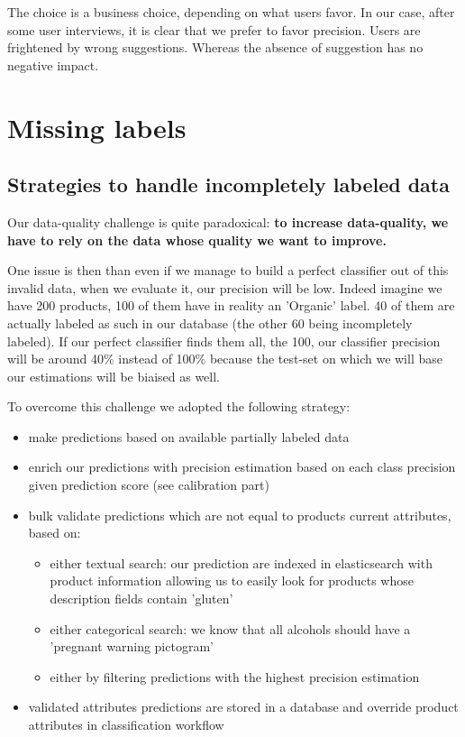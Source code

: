 The choice is a business choice, depending on what users favor. In our case, after some user interviews, it is clear that we prefer to favor precision. Users are frightened by wrong suggestions. Whereas the absence of suggestion has no negative impact.

\section{Missing labels}

\subsection{Strategies to handle incompletely labeled data}

Our data-quality challenge is quite paradoxical: \textbf{to increase data-quality, we have to rely on the data whose quality we want to improve.}

One issue is then than even if we manage to build a perfect classifier out of this invalid data, when we evaluate it, our precision will be low. Indeed imagine we have 200 products, 100 of them have in reality an 'Organic' label. 40 of them are actually labeled as such in our database (the other 60 being incompletely labeled). If our perfect classifier finds them all, the 100, our classifier precision will be around 40\% instead of 100\% because the test-set on which we will base our estimations will be biaised as well.

To overcome this challenge we adopted the following strategy:

\begin{itemize}
	\item make predictions based on available partially labeled data
	\item enrich our predictions with precision estimation based on each class precision given prediction score (see calibration part)
	\item bulk validate predictions which are not equal to products current attributes, based on:
	\begin{itemize}
		\item either textual search: our prediction are indexed in elasticsearch with product information allowing us to easily look for products whose description fields contain 'gluten'
		\item either categorical search: we know that all alcohols should have a 'pregnant warning pictogram'
		\item either by filtering predictions with the highest precision estimation
	\end{itemize}
	\item validated attributes predictions are stored in a database and override product attributes in classification workflow
\end{itemize}

